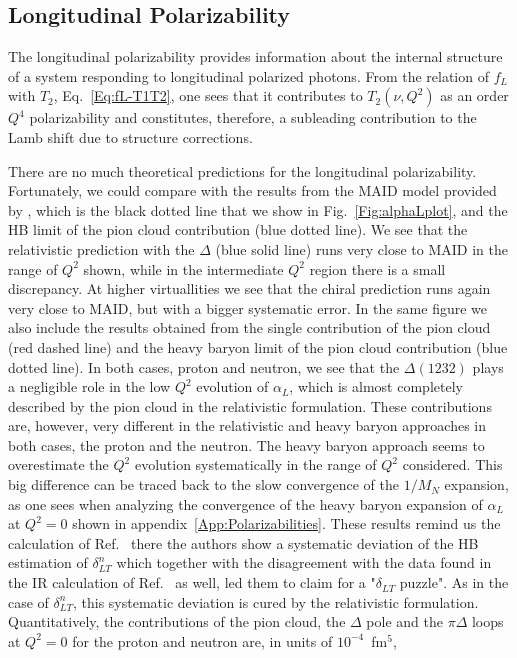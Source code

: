 \documentclass[prc,twocolumn,showpacs,preprintnumbers,amsmath,amssymb
,superscriptaddress,a4paper,nofootinbib
]{revtex4-1}
\begin{document}
\subsection{Longitudinal Polarizability}

The longitudinal polarizability provides information about the internal structure of a system responding to longitudinal polarized photons.
From the relation of $f_L$ with $T_2$, Eq.~\eqref{Eq:fL-T1T2}, one sees that it contributes to $T_2(\nu,Q^2)$ as an order $Q^4$ polarizability and constitutes, therefore, a subleading contribution to the Lamb shift due to structure corrections.




There are no much theoretical predictions for the longitudinal polarizability. 
Fortunately, we could compare with the results from the MAID model \cite{Drechsel:2000ct,Drechsel:1998hk} provided by \cite{private-Lothar}, which is the black dotted line that we show in Fig.~\ref{Fig:alphaLplot}, and the HB limit of the pion cloud contribution (blue dotted line). 
We see that the relativistic prediction with the $\Delta$ (blue solid line) runs very close to MAID in the range of $Q^2$ shown, while in the intermediate $Q^2$ region there is a small discrepancy.
At higher virtuallities we see that the chiral prediction runs again very close to MAID, but with a bigger systematic error.
In the same figure we also include the results obtained from the single contribution of the pion cloud (red dashed line) and the heavy baryon limit of the pion cloud contribution (blue dotted line). 
In both cases, proton and neutron, we see that the $\Delta(1232)$ plays a negligible role in the low $Q^2$ evolution of $\alpha_L$, which is almost completely described by the pion cloud in the relativistic formulation.
These contributions are, however, very different in the relativistic and heavy baryon approaches in both cases, the proton and the neutron.
The heavy baryon approach seems to overestimate the $Q^2$ evolution systematically in the range of $Q^2$ considered. 
This big difference can be traced back to the slow convergence of the $1/M_N$ expansion, as one sees when analyzing the convergence of the heavy baryon expansion of $\alpha_L$ at $Q^2=0$ shown in appendix~\ref{App:Polarizabilities}.
These results remind us the calculation of Ref.~\cite{Kao:2002cp} there the authors show a systematic deviation of the HB estimation of $\delta_{LT}^{n}$ which together with the disagreement with the data found in the IR calculation of Ref.~\cite{Bernard:2002pw} as well, led them to claim for a "$\delta_{LT}$ puzzle". 
As in the case of $\delta_{LT}^n$, this systematic deviation is cured by the relativistic formulation.
Quantitatively, the contributions of the pion cloud, the $\Delta$ pole and the $\pi\Delta$ loops at $Q^2=0$ for the proton and neutron are, in units of $10^{-4}$~fm$^5$,
\end{document}
